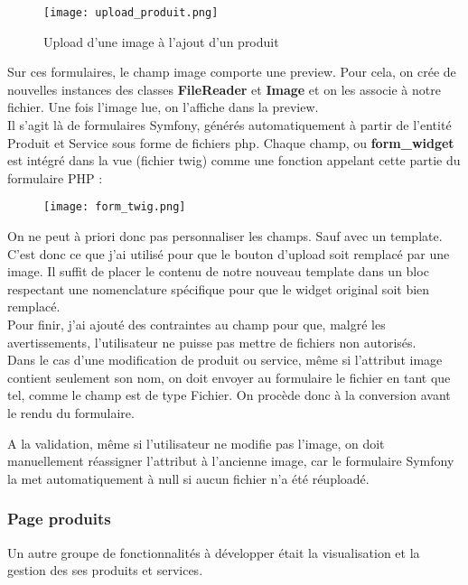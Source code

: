 \begin{figure}[H]
    \texttt{[image: upload\_produit.png]}
    \caption{Upload d'une image à l'ajout d'un produit}
\end{figure}

Sur ces formulaires, le champ image comporte une preview.
Pour cela, on crée de nouvelles instances des classes \textbf{FileReader} et \textbf{Image} et on les associe à notre fichier. 
Une fois l'image lue, on l'affiche dans la preview.\\

Il s'agit là de formulaires Symfony, générés automatiquement à partir de l'entité Produit et Service sous forme de fichiers php.
Chaque champ, ou \textbf{form\_widget} est intégré dans la vue (fichier twig) comme une fonction appelant cette partie du formulaire PHP :

\begin{figure}[H]
    \texttt{[image: form\_twig.png]}
\end{figure}

On ne peut à priori donc pas personnaliser les champs. Sauf avec un template. C'est donc ce que j'ai utilisé pour que le bouton d'upload soit remplacé par une image.
Il suffit de placer le contenu de notre nouveau template dans un bloc respectant une nomenclature spécifique pour que le widget original soit bien remplacé.\\

Pour finir, j'ai ajouté des contraintes au champ pour que, malgré les avertissements, l'utilisateur ne puisse pas mettre de fichiers non autorisés.\\

Dans le cas d'une modification de produit ou service, même si l'attribut image contient seulement son nom, on doit envoyer au formulaire le fichier en tant que tel, comme le champ est de type Fichier. 
On procède donc à la conversion avant le rendu du formulaire. 

A la validation, même si l'utilisateur ne modifie pas l'image, on doit manuellement réassigner l'attribut à l'ancienne image, car le formulaire Symfony la met automatiquement à null si aucun fichier n'a été réuploadé.


\subsubsection{Page produits}
Un autre groupe de fonctionnalités à développer était la visualisation et la gestion des ses produits et services.

